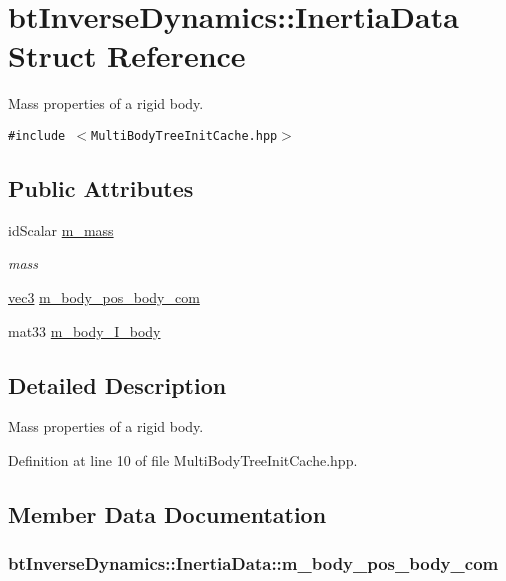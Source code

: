 \hypertarget{structbt_inverse_dynamics_1_1_inertia_data}{
\section{btInverseDynamics::InertiaData Struct Reference}
\label{structbt_inverse_dynamics_1_1_inertia_data}
}
Mass properties of a rigid body.  


{\tt \#include $<$MultiBodyTreeInitCache.hpp$>$}

\subsection*{Public Attributes}
\begin{CompactItemize}
\item 
\hypertarget{structbt_inverse_dynamics_1_1_inertia_data_7fae541ff8201921ef5cd1180dd151e8}{
idScalar \hyperlink{structbt_inverse_dynamics_1_1_inertia_data_7fae541ff8201921ef5cd1180dd151e8}{m\_\-mass}}
\label{structbt_inverse_dynamics_1_1_inertia_data_7fae541ff8201921ef5cd1180dd151e8}

\begin{CompactList}\small\item\em mass \item\end{CompactList}\item 
\hyperlink{classbt_inverse_dynamics_1_1vec3}{vec3} \hyperlink{structbt_inverse_dynamics_1_1_inertia_data_f55b6b71b418109e2c91d37fef2381c1}{m\_\-body\_\-pos\_\-body\_\-com}
\item 
mat33 \hyperlink{structbt_inverse_dynamics_1_1_inertia_data_8812049a71e4002728f5be9d75155fea}{m\_\-body\_\-I\_\-body}
\end{CompactItemize}


\subsection{Detailed Description}
Mass properties of a rigid body. 

Definition at line 10 of file MultiBodyTreeInitCache.hpp.

\subsection{Member Data Documentation}
\hypertarget{structbt_inverse_dynamics_1_1_inertia_data_f55b6b71b418109e2c91d37fef2381c1}{
\subsubsection[m\_\-body\_\-pos\_\-body\_\-com]{ {\bf btInverseDynamics::InertiaData::m\_\-body\_\-pos\_\-body\_\-com}}}
\label{structbt_inverse_dynamics_1_1_inertia_data_f55b6b71b418109e2c91d37fef2381c1}


